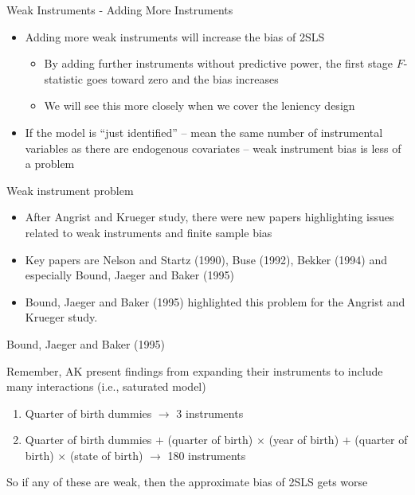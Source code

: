 \documentclass{beamer}
\begin{document}
\begin{frame}{Weak Instruments - Adding More Instruments}

  \begin{itemize}
    \item Adding more weak instruments will increase the bias of 2SLS
          \begin{itemize}
            \item By adding further instruments without predictive power, the first stage $F$-statistic goes toward zero and the bias increases
            \item We will see this more closely when we cover the leniency design
          \end{itemize}
    \item If the model is ``just identified'' -- mean the same number of instrumental variables as there are endogenous covariates -- weak instrument bias is less of a problem
  \end{itemize}
\end{frame}

\begin{frame}{Weak instrument problem}

  \begin{itemize}
    \item After Angrist and Krueger study, there were new papers highlighting issues related to weak instruments and finite sample bias
    \item Key papers are Nelson and Startz (1990), Buse (1992), Bekker (1994) and especially Bound, Jaeger and Baker (1995)
    \item Bound, Jaeger and Baker (1995) highlighted this problem for the Angrist and Krueger study.
  \end{itemize}

\end{frame}

\begin{frame}{Bound, Jaeger and Baker (1995)}

  Remember, AK present findings from expanding their instruments to include many interactions (i.e., saturated model)
  \begin{enumerate}
    \item Quarter of birth dummies $\rightarrow$ 3 instruments
    \item Quarter of birth dummies $+$ (quarter of birth) $\times$ (year of birth) $+$ (quarter of birth) $\times$ (state of birth) $\rightarrow$ 180 instruments
  \end{enumerate}
  So if any of these are weak, then the approximate bias of 2SLS gets worse

\end{frame}
\end{document}
